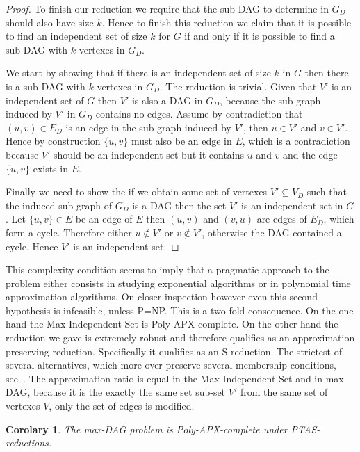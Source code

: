\documentclass[a4paper]{article}
\newtheorem{corolary}{Corolary}
\begin{document}
\begin{proof}
  To finish our reduction we require that the sub-DAG to determine in $G_D$
  should also have size $k$. Hence to finish this reduction we claim that
  it is possible to find an independent set of size $k$ for $G$ if and only
  if it is possible to find a sub-DAG with $k$ vertexes in $G_D$.

  We start by showing that if there is an independent set of size $k$
  in $G$ then there is a sub-DAG with $k$ vertexes in $G_D$. The reduction
  is trivial. Given that $V'$ is an independent set of $G$ then $V'$ is
  also a DAG in $G_D$, because the sub-graph induced by $V'$ in $G_D$
  contains no edges. Assume by contradiction that $(u,v) \in E_D$ is an
  edge in the sub-graph induced by $V'$, then $u \in V'$ and $v \in
  V'$. Hence by construction $\{u,v\}$ must also be an edge in $E$, which
  is a contradiction because $V'$ should be an independent set but it
  contains $u$ and $v$ and the edge $\{u,v\}$ exists in $E$.

  Finally we need to show the if we obtain some set of vertexes
  $V'\subseteq V_D$ such that the induced sub-graph of $G_D$ is a DAG then
  the set $V'$ is an independent set in $G$. Let $\{u, v\} \in E$ be an
  edge of $E$ then $(u,v)$ and $(v,u)$ are edges of $E_D$, which form a
  cycle. Therefore either $u \notin V'$ or $v \notin V'$, otherwise the DAG
  contained a cycle. Hence $V'$ is an independent set.
%
\end{proof}
%
This complexity condition seems to imply that a pragmatic approach to the
problem either consists in studying exponential algorithms or in polynomial
time approximation algorithms. On closer inspection however even this
second hypothesis is infeasible, unless P=NP. This is a two fold
consequence. On the one hand the Max Independent Set is
Poly-APX-complete. On the other hand the reduction we gave is extremely
robust and therefore qualifies as an approximation preserving reduction.
Specifically it qualifies as an S-reduction. The strictest of several
alternatives, which more over preserve several membership conditions,
see~\citet{Crescenzi}. The approximation ratio is equal in the Max
Independent Set and in max-DAG, because it is the exactly the same set
sub-set $V'$ from the same set of vertexes $V$, only the set of edges is
modified.
%
\begin{corolary}
The max-DAG problem is Poly-APX-complete under PTAS-reductions.
  \label{cor:APX}
\end{corolary}
%
\end{document}
